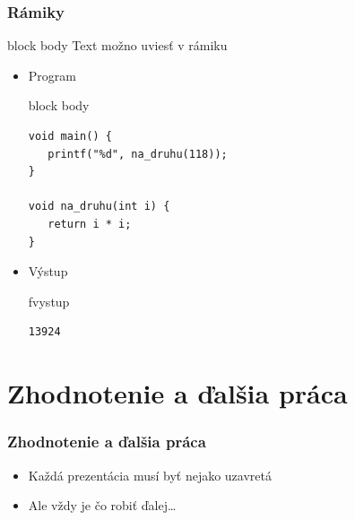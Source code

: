 \documentclass{beamer}
\newenvironment{program}{\begin{beamercolorbox}[rounded=true,shadow=true]{block body}\vspace{-4mm}}{\vspace{-2mm}\end{beamercolorbox}}
\newenvironment{vystup}{\begin{beamercolorbox}[rounded=true,shadow=true]{fvystup}}{\end{beamercolorbox}}
\newenvironment{poznamka}{\begin{beamercolorbox}[rounded=true,shadow=false]{block body}}{\end{beamercolorbox}}
\begin{document}
\begin{frame}[fragile=singleslide]\frametitle{Rámiky}
\begin{poznamka}
Text možno uviesť v rámiku
\end{poznamka}

\begin{itemize}
\item Program

\begin{program}
\begin{lstlisting}
void main() {
   printf("%d", na_druhu(118));
}

void na_druhu(int i) {
   return i * i;
}
\end{lstlisting}
\end{program}

\item Výstup
\begin{vystup}
\begin{lstlisting}
13924
\end{lstlisting}
\end{vystup}

\end{itemize}
\end{frame}



\section*{Zhodnotenie a ďalšia práca}

\begin{frame}[fragile=singleslide]\frametitle{Zhodnotenie a ďalšia práca}
\begin{itemize}
\item Každá prezentácia musí byť nejako uzavretá
\item Ale vždy je čo robiť ďalej\ldots{}
\end{itemize}
\end{frame}
\end{document}
